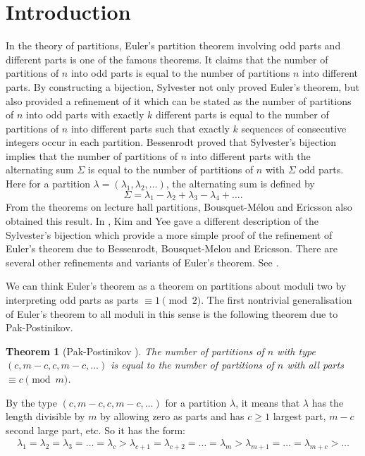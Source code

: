 \documentclass[draft]{amsart}
\numberwithin{equation}{section}
\theoremstyle{plain}
\newtheorem{theorem}{Theorem}[section]
\theoremstyle{remark}
\begin{document}
\section{Introduction}
In the theory of partitions, Euler's partition theorem involving odd parts and different parts is one of the famous theorems. It claims that the number of partitions of $n$ into odd parts is equal to  the number of partitions $n$ into different 
parts. By constructing a bijection, Sylvester \cite{Syl82} not only proved Euler's theorem, but also provided a refinement of it which can be stated as the number of partitions of $n$ into odd parts with exactly $k$ different parts is equal to the number of partitions of $n$ into different parts such that exactly $k$ sequences of consecutive integers occur in each partition.  Bessenrodt  \cite{bes94} proved that Sylvester's bijection implies that the number of partitions of $n$ into different parts with the alternating sum $\Sigma$ is equal to the number of partitions of $n$ with $\Sigma$ odd parts. Here for a partition $\lambda=(\lambda_1,\lambda_2,\dots)$, the alternating sum is defined by 
$$
\Sigma=\lambda_{1}-\lambda_{2}+\lambda_{3}-\lambda_{4}+\dots.
$$
From the theorems on lecture hall partitions, Bousquet-M\'{e}lou and Ericsson \cite{bou97, bou972} also obtained this result. In \cite{Kim-Yee}, Kim and Yee gave a different description of the Sylvester's bijection which provide a more simple proof of the refinement of Euler's theorem due to Bessenrodt, Bousquet-Melou and Ericsson. There are several other refinements and variants of Euler's theorem. See \cite{All3, AndrewsEuler, Chen, Pak, SavageYee,Yee2001, Yee2002, Zeng}.

We can think Euler's theorem as a theorem on partitions about moduli two by interpreting odd parts as  parts $\equiv 1\pmod 2.$ 
The first nontrivial generalisation of Euler's theorem to all moduli in this sense is the following theorem due to Pak-Postinikov.

 \begin{theorem}[Pak-Postinikov \cite{Pak-Postnikov}]   \label{puretype thm} 
 The number of partitions of $n$ with type $(c, m-c, c, m-c,\dots)$  is equal to the number of partitions of $n$ with all parts $\equiv c \pmod m$.
 \end{theorem}
By the type $(c, m-c,c,m-c,\dots)$ for a partition $\lambda$, it means that $\lambda$ has the length divisible by $m$ by allowing zero as parts  and has $c\geq 1$ largest part, $m-c$ second large part, etc. So it has the form:
\begin{align*}
\lambda_{1}=\lambda_{2}=\lambda_{3}=\dots=\lambda_{c}>\lambda_{c+1}=\lambda_{c+2}= \dots = \lambda_{m}>\lambda_{m+1}=\dots=\lambda_{m+c}>\dots
\end{align*}
\end{document}
